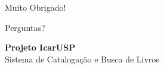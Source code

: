 \documentclass{beamer}
\begin{document}
\begin{frame}
\begin{center}
{\Huge Muito Obrigado!}
\vspace{1cm}

{\Large Perguntas?}
\vspace{1cm}

\textbf{Projeto IcarUSP}\\
Sistema de Catalogação e Busca de Livros
\end{center}
\end{frame}
\end{document}
